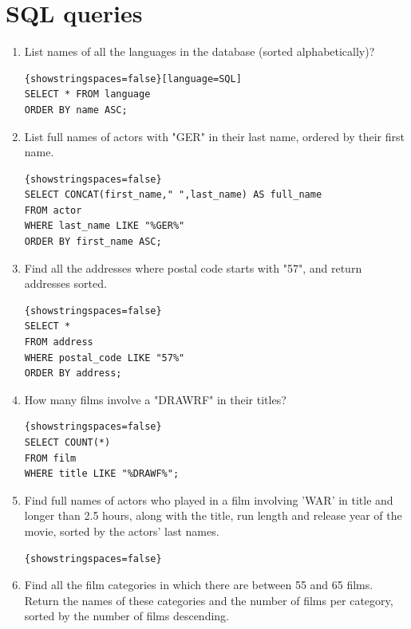 \documentclass{article}
\begin{document}
\section*{SQL queries}
\begin{enumerate}
	\item List names of all the languages in the database (sorted alphabetically)?\\
	\begin{lstlisting}{showstringspaces=false}[language=SQL]
SELECT * FROM language
ORDER BY name ASC;
	\end{lstlisting}
	
	\item List full names of actors with "GER" in their last name, ordered by their first name.\\
	\begin{lstlisting}{showstringspaces=false}
SELECT CONCAT(first_name," ",last_name) AS full_name
FROM actor
WHERE last_name LIKE "%GER%"
ORDER BY first_name ASC;
	\end{lstlisting}
	
	\item Find all the addresses where postal code starts with "57", and return addresses sorted.
	\begin{lstlisting}{showstringspaces=false}
SELECT *
FROM address
WHERE postal_code LIKE "57%"
ORDER BY address;
	\end{lstlisting}
	
	\item How many films involve a "DRAWRF" in their titles?
	
	\begin{lstlisting}{showstringspaces=false}
SELECT COUNT(*) 
FROM film
WHERE title LIKE "%DRAWF%";
	\end{lstlisting}
	
	\item Find full names of actors who played in a film involving 'WAR' in title and longer than 2.5 hours, along with the title, run length and release year of the movie, sorted by the actors' last names. 
	
	\begin{lstlisting}{showstringspaces=false}

	\end{lstlisting}

	\item Find all the film categories in which there are between 55 and 65 films. Return the names of these categories and the number of films per category, sorted by the number of films descending.
	

\end{enumerate}
\end{document}
